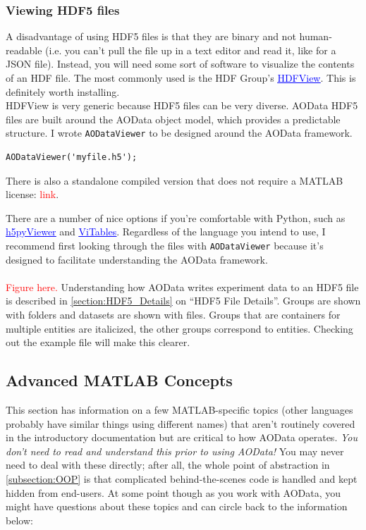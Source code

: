 \documentclass[10pt]{exam}
\newcommand\myurl[1]{\textcolor{blue}{\underline{#1}}}
\newcommand\aodclass[1]{\textcolor{codeblue}{\texttt{#1}}}
\begin{document}
		\subsubsection{Viewing HDF5 files}
			\noindent A disadvantage of using HDF5 files is that they are binary and not human-readable (i.e. you can't pull the file up in a text editor and read it, like for a JSON file). Instead, you will need some sort of software to visualize the contents of an HDF file. The most commonly used is the HDF Group's \href{https://www.hdfgroup.org/downloads/hdfview/}{\myurl{HDFView}}. This is definitely worth installing. 
			\\
			HDFView is very generic because HDF5 files can be very diverse. AOData HDF5 files are built around the AOData object model, which provides a predictable structure. 
			I wrote \aodclass{AODataViewer} to be designed around the AOData framework. 
			\begin{lstlisting}[style=matlab-editor, basicstyle=\mlttfamily\footnotesize]
AODataViewer('myfile.h5');
			\end{lstlisting}
			There is also a standalone compiled version that does not require a MATLAB license: \textcolor{red}{link}.
			
			There are a number of nice options if you're comfortable with Python, such as \href{https://github.com/ganymede42/h5pyViewer}{\myurl{h5pyViewer}} and \href{https://vitables.org}{\myurl{ViTables}}. Regardless of the language you intend to use, I recommend first looking through the files with \aodclass{AODataViewer} because it's designed to facilitate understanding the AOData framework.
			\\$\quad$\\
			\noindent \textcolor{red}{Figure here.} Understanding how AOData writes experiment data to an HDF5 file is described in \myurl{\ref{section:HDF5_Details}} on ``HDF5 File Details''. Groups are shown with folders and datasets are shown with files. Groups that are containers for multiple entities are italicized, the other groups correspond to entities. Checking out the example file will make this clearer.
	\subsection{Advanced MATLAB Concepts}
		\noindent This section has information on a few MATLAB-specific topics (other languages probably have similar things using different names) that aren't routinely covered in the introductory documentation but are critical to how AOData operates. \textit{You don't need to read and understand this prior to using AOData!} You may never need to deal with these directly; after all, the whole point of abstraction in \ref{subsection:OOP} is that complicated behind-the-scenes code is handled and kept hidden from end-users. 
		At some point though as you work with AOData, you might have questions about these topics and can circle back to the information below:
\end{document}
